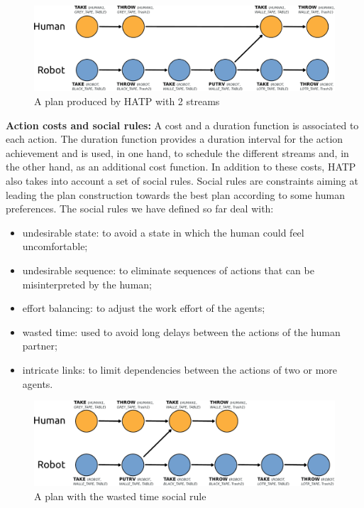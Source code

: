 \documentclass[preprint,12pt]{elsarticle}
\begin{document}
\begin{figure}[htbp]
  \centering
  \includegraphics[width=0.95\columnwidth]{./figs/first_plan.pdf}
  \caption{A plan produced by HATP with 2 streams}
  \label{plan_hatp1}
\end{figure}

\vspace{0.3cm}
\noindent
\textbf{Action costs and social rules:}
A cost and a duration function is associated to each action.
The duration function provides a duration interval for the action
achievement and is used, in one hand, to schedule the different
streams and, in the other hand, as an additional cost function.
In addition to these costs, HATP also takes into account a set of social
rules.  Social rules are constraints aiming at leading the plan
construction towards the best plan according to some human
preferences. The social rules we have defined so far deal with:

\begin{itemize}
\item undesirable state: to avoid a state in which the human could
  feel uncomfortable;
\item undesirable sequence: to eliminate sequences of actions that can
  be misinterpreted by the human;
\item effort balancing: to adjust the work effort of the agents;
\item wasted time: used to avoid long delays between the actions of
  the human partner;
\item intricate links: to limit dependencies between the actions of
  two or more agents.
\end{itemize}

\begin{figure}[htbp]
  \centering
  \includegraphics[width=0.95\columnwidth]{./figs/second_plan.pdf}
  \caption{A plan with the wasted time social rule}
  \label{plan_hatp2}
\end{figure}
\end{document}
